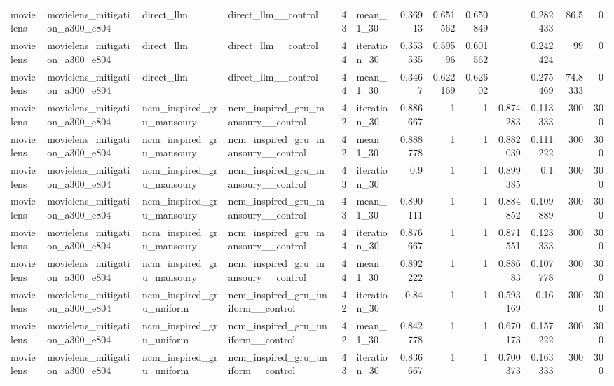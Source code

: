 \begin{table}[htbp!]
\begin{tabular}{llllrlrrrrrrr}
movielens & movielens\_mitigation\_a300\_e804 & direct\_llm & direct\_llm\_\_control & 43 & mean\_1\_30 & 0.36913 & 0.651562 & 0.650849 & \textemdash{} & 0.282433 & 86.5 & 0 \\
movielens & movielens\_mitigation\_a300\_e804 & direct\_llm & direct\_llm\_\_control & 44 & iteration\_30 & 0.353535 & 0.59596 & 0.601562 & \textemdash{} & 0.242424 & 99 & 0 \\
movielens & movielens\_mitigation\_a300\_e804 & direct\_llm & direct\_llm\_\_control & 44 & mean\_1\_30 & 0.3467 & 0.622169 & 0.62602 & \textemdash{} & 0.275469 & 74.8333 & 0 \\
movielens & movielens\_mitigation\_a300\_e804 & ncm\_inspired\_gru\_mansoury & ncm\_inspired\_gru\_mansoury\_\_control & 42 & iteration\_30 & 0.886667 & 1 & 1 & 0.874283 & 0.113333 & 300 & 300 \\
movielens & movielens\_mitigation\_a300\_e804 & ncm\_inspired\_gru\_mansoury & ncm\_inspired\_gru\_mansoury\_\_control & 42 & mean\_1\_30 & 0.888778 & 1 & 1 & 0.882039 & 0.111222 & 300 & 300 \\
movielens & movielens\_mitigation\_a300\_e804 & ncm\_inspired\_gru\_mansoury & ncm\_inspired\_gru\_mansoury\_\_control & 43 & iteration\_30 & 0.9 & 1 & 1 & 0.899385 & 0.1 & 300 & 300 \\
movielens & movielens\_mitigation\_a300\_e804 & ncm\_inspired\_gru\_mansoury & ncm\_inspired\_gru\_mansoury\_\_control & 43 & mean\_1\_30 & 0.890111 & 1 & 1 & 0.884852 & 0.109889 & 300 & 300 \\
movielens & movielens\_mitigation\_a300\_e804 & ncm\_inspired\_gru\_mansoury & ncm\_inspired\_gru\_mansoury\_\_control & 44 & iteration\_30 & 0.876667 & 1 & 1 & 0.871551 & 0.123333 & 300 & 300 \\
movielens & movielens\_mitigation\_a300\_e804 & ncm\_inspired\_gru\_mansoury & ncm\_inspired\_gru\_mansoury\_\_control & 44 & mean\_1\_30 & 0.892222 & 1 & 1 & 0.88683 & 0.107778 & 300 & 300 \\
movielens & movielens\_mitigation\_a300\_e804 & ncm\_inspired\_gru\_uniform & ncm\_inspired\_gru\_uniform\_\_control & 42 & iteration\_30 & 0.84 & 1 & 1 & 0.593169 & 0.16 & 300 & 300 \\
movielens & movielens\_mitigation\_a300\_e804 & ncm\_inspired\_gru\_uniform & ncm\_inspired\_gru\_uniform\_\_control & 42 & mean\_1\_30 & 0.842778 & 1 & 1 & 0.670173 & 0.157222 & 300 & 300 \\
movielens & movielens\_mitigation\_a300\_e804 & ncm\_inspired\_gru\_uniform & ncm\_inspired\_gru\_uniform\_\_control & 43 & iteration\_30 & 0.836667 & 1 & 1 & 0.700373 & 0.163333 & 300 & 300 \\

\end{tabular}
\end{table}
